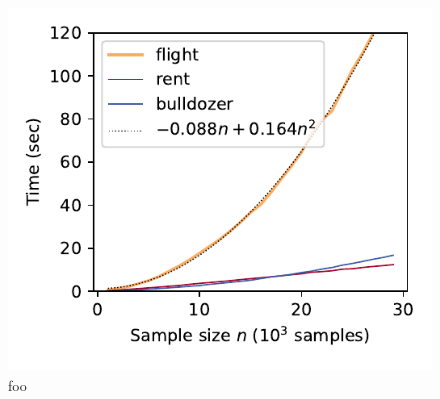 \documentclass[11pt]{article}
\begin{document}
\begin{figure}[htbp]
\begin{center}
\includegraphics[scale=0.7]{images/timing}
\caption{\small foo}
\label{fig:timing}
\end{center}
\end{figure}
\end{document}
